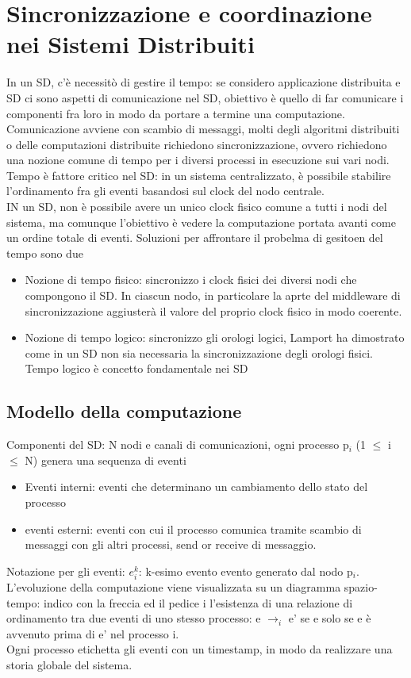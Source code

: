 \documentclass[16px]{article}
\begin{document}
\section{Sincronizzazione e coordinazione nei Sistemi Distribuiti}
In un SD, c'è necessitò di gestire il tempo: se considero applicazione distribuita e SD ci sono aspetti di comunicazione nel SD, obiettivo è quello di far comunicare i componenti fra loro in modo da portare a termine una computazione. Comunicazione avviene con scambio di messaggi, molti degli algoritmi distribuiti o delle computazioni distribuite richiedono sincronizzazione, ovvero richiedono una nozione comune di tempo per i diversi processi in esecuzione sui vari nodi. Tempo è fattore critico nel SD: in un sistema centralizzato, è possibile stabilire l'ordinamento fra gli eventi basandosi sul clock del nodo centrale.\\ IN un SD, non è possibile avere un unico clock fisico comune a tutti i nodi del sistema, ma comunque l'obiettivo è vedere la computazione portata avanti come un ordine totale di eventi. Soluzioni per affrontare il probelma di gesitoen del tempo sono due
\begin{itemize}
\item Nozione di tempo fisico: sincronizzo i clock fisici dei diversi nodi che compongono il SD. In ciascun nodo, in particolare la aprte del middleware di sincronizzazione aggiusterà il valore del proprio clock fisico in modo coerente.
\item Nozione di tempo logico: sincronizzo gli orologi logici, Lamport ha dimostrato come in un SD non sia necessaria la sincronizzazione degli orologi fisici. Tempo logico è concetto fondamentale nei SD
\end{itemize}
\subsection{Modello della computazione}
Componenti del SD: N nodi e canali di comunicazioni, ogni processo p$_i$ (1 $\leq$ i $\leq$ N) genera una sequenza di eventi
\begin{itemize}
\item Eventi interni: eventi che determinano un cambiamento dello stato del processo
\item eventi esterni: eventi con cui il processo comunica tramite scambio di messaggi con gli altri processi, send or receive di messaggio.
\end{itemize}
Notazione per gli eventi: $e_{i}^k$: k-esimo evento evento generato dal nodo p$_i$. L'evoluzione della computazione viene visualizzata su un diagramma spazio-tempo: indico con la freccia ed il pedice i l'esistenza di una relazione di ordinamento tra due eventi di uno stesso processo: e $\rightarrow_i$ e' se e solo se e è avvenuto prima di e' nel processo i.\\ Ogni processo etichetta gli eventi con un timestamp, in modo da realizzare una storia globale del sistema.
\end{document}
